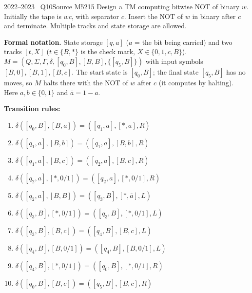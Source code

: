 \documentclass[11pt,a4paper]{article}
\begin{document}
\begin{question}{2022--2023 \textbullet\ Q10}{Source M52}{15}
Design a TM computing bitwise NOT of binary $w$. Initially the tape is $wc$, with separator $c$. Insert the NOT of $w$ in binary after $c$ and terminate. Multiple tracks and state storage are allowed.
\end{question}
\begin{solution}
\textbf{Formal notation.} State storage $[q,a]$ ($a$ = the bit being carried) and two tracks $[t,X]$ ($t\in\{B,\ast\}$ is the check mark, $X\in\{0,1,c,B\}$). $M=(Q,\Sigma,\Gamma,\delta,[q_0,B],[B,B],\{[q_5,B]\})$ with input symbols $[B,0],[B,1],[B,c]$. The start state is $[q_0,B]$; the final state $[q_5,B]$ has no moves, so $M$ halts there with the NOT of $w$ after $c$ (it computes by halting). Here $a,b\in\{0,1\}$ and $\bar a=1-a$.
\par\noindent\textbf{Transition rules:}
{\small\begin{enumerate}[label=\arabic*.,itemsep=0pt]
\item $\delta([q_0,B],[B,a])=([q_1,a],[\ast,a],R)$
\item $\delta([q_1,a],[B,b])=([q_1,a],[B,b],R)$
\item $\delta([q_1,a],[B,c])=([q_2,a],[B,c],R)$
\item $\delta([q_2,a],[\ast,0/1])=([q_2,a],[\ast,0/1],R)$
\item $\delta([q_2,a],[B,B])=([q_3,B],[\ast,\bar a],L)$
\item $\delta([q_3,B],[\ast,0/1])=([q_3,B],[\ast,0/1],L)$
\item $\delta([q_3,B],[B,c])=([q_4,B],[B,c],L)$
\item $\delta([q_4,B],[B,0/1])=([q_4,B],[B,0/1],L)$
\item $\delta([q_4,B],[\ast,0/1])=([q_0,B],[\ast,0/1],R)$
\item $\delta([q_0,B],[B,c])=([q_5,B],[B,c],R)$
\end{enumerate}}
\end{solution}
\end{document}
